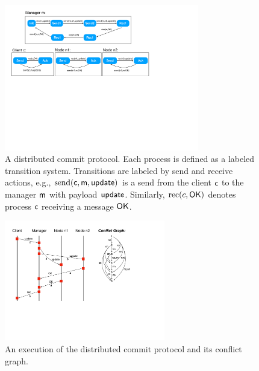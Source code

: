 \begin{figure}[t]
\begin{center}
\includegraphics[width=8.5cm]{commit.pdf}
\end{center}
\vspace{-5.5mm}
\caption{A distributed commit protocol. Each process is defined as a labeled transition system. Transitions are labeled by send and receive actions, e.g., $\mathrm{send}({\sf{c},\sf{m},\sf{update}})$ is a send from the client $\sf{c}$ to the manager $\sf{m}$ with payload $\sf{update}$. Similarly, $\mathrm{rec}({c,\sf{OK}})$ denotes process $\sf{c}$ receiving a message 
$\sf{OK}$.}
\label{fig:commit}
\vspace{-3.5mm}
\end{figure}

\begin{figure}[t]
\begin{center}
\includegraphics[width=7cm]{MSC-commit.pdf}
\end{center}
\vspace{-5mm}
\caption{An execution of the distributed commit protocol and its conflict graph.}
\label{fig:commit-exec}
\vspace{-7mm}
\end{figure}

